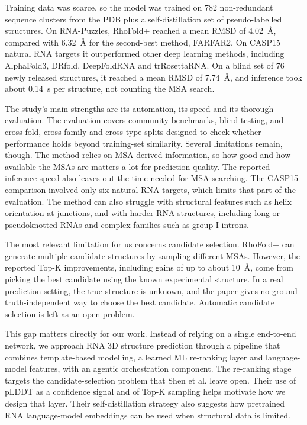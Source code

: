 \documentclass{FastFyp}
\begin{document}
Training data was scarce, so the model was trained on 782 non-redundant sequence clusters from the PDB plus a self-distillation set of pseudo-labelled structures. On RNA-Puzzles, RhoFold+ reached a mean RMSD of 4.02~\AA{}, compared with 6.32~\AA{} for the second-best method, FARFAR2. On CASP15 natural RNA targets it outperformed other deep learning methods, including AlphaFold3, DRfold, DeepFoldRNA and trRosettaRNA. On a blind set of 76 newly released structures, it reached a mean RMSD of 7.74~\AA{}, and inference took about 0.14~s per structure, not counting the MSA search.

The study's main strengths are its automation, its speed and its thorough evaluation. The evaluation covers community benchmarks, blind testing, and cross-fold, cross-family and cross-type splits designed to check whether performance holds beyond training-set similarity. Several limitations remain, though. The method relies on MSA-derived information, so how good and how available the MSAs are matters a lot for prediction quality. The reported inference speed also leaves out the time needed for MSA searching. The CASP15 comparison involved only six natural RNA targets, which limits that part of the evaluation. The method can also struggle with structural features such as helix orientation at junctions, and with harder RNA structures, including long or pseudoknotted RNAs and complex families such as group I introns.

The most relevant limitation for us concerns candidate selection. RhoFold+ can generate multiple candidate structures by sampling different MSAs. However, the reported Top-K improvements, including gains of up to about 10~\AA{}, come from picking the best candidate using the known experimental structure. In a real prediction setting, the true structure is unknown, and the paper gives no ground-truth-independent way to choose the best candidate. Automatic candidate selection is left as an open problem.

This gap matters directly for our work. Instead of relying on a single end-to-end network, we approach RNA 3D structure prediction through a pipeline that combines template-based modelling, a learned ML re-ranking layer and language-model features, with an agentic orchestration component. The re-ranking stage targets the candidate-selection problem that Shen et al. \cite{ref:Shen:2024} leave open. Their use of pLDDT as a confidence signal and of Top-K sampling helps motivate how we design that layer. Their self-distillation strategy also suggests how pretrained RNA language-model embeddings can be used when structural data is limited.
\end{document}
